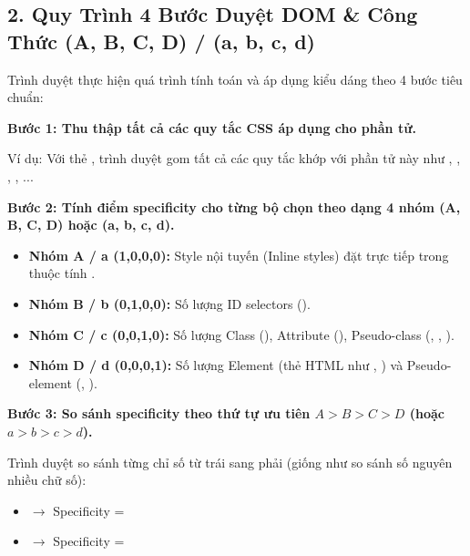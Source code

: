 \subsection{2. Quy Trình 4 Bước Duyệt DOM \& Công Thức (A, B, C, D) / (a, b, c, d)}

Trình duyệt thực hiện quá trình tính toán và áp dụng kiểu dáng theo 4 bước tiêu chuẩn:

\begin{conceptBox}
\textbf{Bước 1: Thu thập tất cả các quy tắc CSS áp dụng cho phần tử.} \par
Ví dụ: Với thẻ , trình duyệt gom tất cả các quy tắc khớp với phần tử này như , , , , ...
\par\vspace{4pt}
\textbf{Bước 2: Tính điểm specificity cho từng bộ chọn theo dạng 4 nhóm (A, B, C, D) hoặc (a, b, c, d).}
\begin{itemize}[leftmargin=1.5em, itemsep=2pt, parsep=0pt]
    \item \textbf{Nhóm A / a (1,0,0,0):} Style nội tuyến (Inline styles) đặt trực tiếp trong thuộc tính .
    \item \textbf{Nhóm B / b (0,1,0,0):} Số lượng ID selectors ().
    \item \textbf{Nhóm C / c (0,0,1,0):} Số lượng Class (), Attribute (\codeinline{[type="text"]}), Pseudo-class (, , ).
    \item \textbf{Nhóm D / d (0,0,0,1):} Số lượng Element (thẻ HTML như , ) và Pseudo-element (, ).
\end{itemize}
\par\vspace{4pt}
\textbf{Bước 3: So sánh specificity theo thứ tự ưu tiên $A > B > C > D$ (hoặc $a > b > c > d$).} \par
Trình duyệt so sánh từng chỉ số từ trái sang phải (giống như so sánh số nguyên nhiều chữ số):
\begin{itemize}[leftmargin=1.5em, itemsep=2pt, parsep=0pt]
    \item {} $\rightarrow$ Specificity = 
    \item {} $\rightarrow$ Specificity = 

\end{itemize}
\end{conceptBox}
